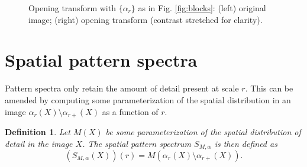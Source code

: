 \documentclass{sciposter}
\newtheorem{Def}{Definition}
\begin{document}
\begin{multicols}{3}
\begin{figure}
\begin{center}
{}
{}
\end{center}
\caption{ \label{fig:opentransf} Opening transform with $\{\alpha_r\}$ as in 
 Fig. \ref{fig:blocks}: (left) original image; (right) opening transform
(contrast stretched for clarity). 
}
\end{figure}


\section{Spatial pattern spectra}
Pattern spectra only retain the amount of detail present at  scale $r$.
This can be amended by computing some parameterization of the spatial 
distribution in an image $\alpha_r(X) \setminus \alpha_{r+}(X)$ as a function of $r$. 

\begin{Def}
Let ${M}(X)$ be some parameterization of the spatial distribution of detail
in the image $X$. The spatial pattern spectrum ${S}_{{M},\alpha}$ is
then defined as
\begin{equation}
  ({S}_{{M},\alpha}(X))(r) = {M}(\alpha_r(X) \setminus \alpha_{r+}(X)).
\end{equation}  
\end{Def}


\end{multicols}
\end{document}
